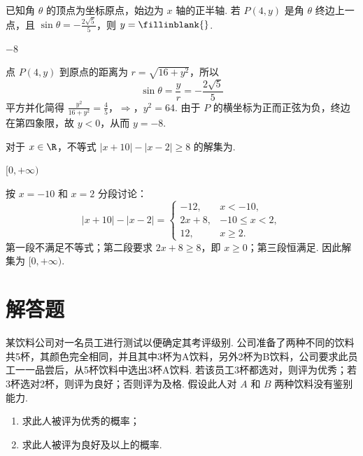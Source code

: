 \begin{problem}
已知角 \(\theta\) 的顶点为坐标原点，始边为 \(x\) 轴的正半轴. 若 \(P(4, y)\) 是角 \(\theta\) 终边上一点，且 \(\sin \theta = -\frac{2\sqrt{5}}{5}\)，则 \(y =\fillinblank{}\).
\end{problem}

\begin{answer}
\(-8\)
\end{answer}

\begin{solution}
点 \(P(4,y)\) 到原点的距离为 \(r=\sqrt{16+y^2}\)，所以
\[
\sin\theta=\frac{y}{r}=-\frac{2\sqrt5}{5}
\]
平方并化简得
\(\frac{y^2}{16+y^2}=\frac45\)，\(\Longrightarrow\)，\(y^2=64\).
由于 \(P\) 的横坐标为正而正弦为负，终边在第四象限，故 \(y<0\)，从而 \(y=-8\).
\end{solution}

\begin{problem}
对于 \(x \in \R\)，不等式 \(|x + 10| - |x - 2| \geqslant 8\) 的解集为\fillinblank{}.
\end{problem}

\begin{answer}
\([0,+\infty)\)
\end{answer}

\begin{solution}
按 \(x=-10\) 和 \(x=2\) 分段讨论：
\[
|x+10|-|x-2|=
\begin{cases}
-12,&x<-10,\\
2x+8,&-10\le x<2,\\
12,&x\ge2.
\end{cases}
\]
第一段不满足不等式；第二段要求 \(2x+8\ge8\)，即 \(x\ge0\)；第三段恒满足. 因此解集为 \([0,+\infty)\).
\end{solution}

\section{解答题}

\begin{problem}
某饮料公司对一名员工进行测试以便确定其考评级别. 公司准备了两种不同的饮料共5杯，其颜色完全相同，并且其中3杯为A饮料，另外2杯为B饮料，公司要求此员工一一品尝后，从5杯饮料中选出3杯A饮料. 若该员工3杯都选对，则评为优秀；若3杯选对2杯，则评为良好；否则评为及格. 假设此人对 \(A\) 和 \(B\) 两种饮料没有鉴别能力.
\begin{enumerate}
\item 求此人被评为优秀的概率；
\item 求此人被评为良好及以上的概率.
\end{enumerate}
\end{problem}

